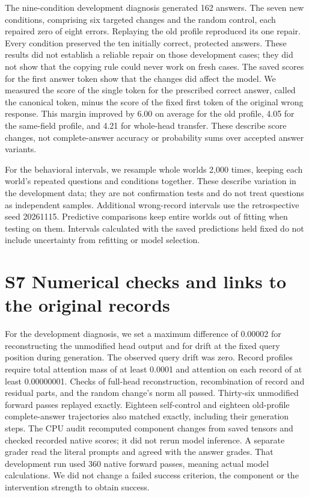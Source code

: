 \documentclass[10pt,letterpaper]{article}
\begin{document}
The nine-condition development diagnosis generated 162 answers. The seven new conditions, comprising six targeted changes and the random control, each repaired zero of eight errors. Replaying the old profile reproduced its one repair. Every condition preserved the ten initially correct, protected answers. These results did not establish a reliable repair on those development cases; they did not show that the copying rule could never work on fresh cases. The saved scores for the first answer token show that the changes did affect the model. We measured the score of the single token for the prescribed correct answer, called the canonical token, minus the score of the fixed first token of the original wrong response. This margin improved by 6.00 on average for the old profile, 4.05 for the same-field profile, and 4.21 for whole-head transfer. These describe score changes, not complete-answer accuracy or probability sums over accepted answer variants.


For the behavioral intervals, we resample whole worlds 2,000 times, keeping each world's repeated questions and conditions together. These describe variation in the development data; they are not confirmation tests and do not treat questions as independent samples. Additional wrong-record intervals use the retrospective seed 20261115. Predictive comparisons keep entire worlds out of fitting when testing on them. Intervals calculated with the saved predictions held fixed do not include uncertainty from refitting or model selection.


\section*{S7 Numerical checks and links to the original records}

For the development diagnosis, we set a maximum difference of 0.00002 for reconstructing the unmodified head output and for drift at the fixed query position during generation. The observed query drift was zero. Record profiles require total attention mass of at least 0.0001 and attention on each record of at least 0.00000001. Checks of full-head reconstruction, recombination of record and residual parts, and the random change's norm all passed. Thirty-six unmodified forward passes replayed exactly. Eighteen self-control and eighteen old-profile complete-answer trajectories also matched exactly, including their generation steps. The CPU audit recomputed component changes from saved tensors and checked recorded native scores; it did not rerun model inference. A separate grader read the literal prompts and agreed with the answer grades. That development run used 360 native forward passes, meaning actual model calculations. We did not change a failed success criterion, the component or the intervention strength to obtain success.
\end{document}

